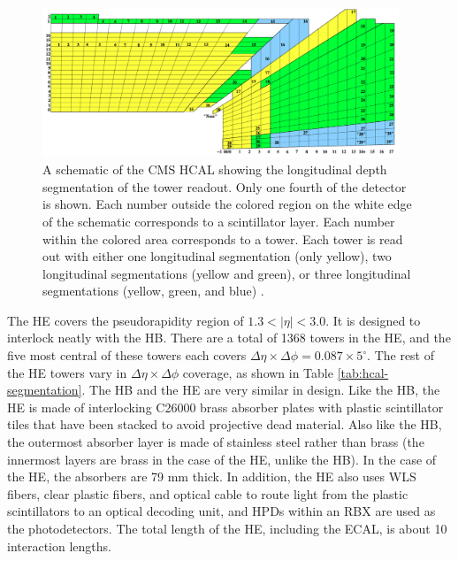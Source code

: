 \begin{figure}
  \centering
  \includegraphics[width=0.95\textwidth]{tex/cms/fig/hcal-segmentation.png}
  \caption{A schematic of the CMS HCAL showing the longitudinal depth
    segmentation of the tower readout.  Only one fourth of the detector is shown.
    Each number outside the colored region on the white edge of the schematic corresponds to a 
    scintillator layer.  Each number within the colored area corresponds to a tower.  
    Each tower is read out with either one longitudinal segmentation (only yellow),
    two longitudinal segmentations (yellow and green), or three longitudinal 
    segmentations (yellow, green, and blue) \cite{hcal-geometry}.}   
  \label{fig:hcal-segmentation}
\end{figure}

The HE covers the pseudorapidity region of $1.3 < |\eta| < 3.0$.
It is designed to interlock neatly with the HB.
There are a total of 1368 towers in the HE, and the five most 
central of these towers each covers $\Delta\eta\times\Delta\phi = 0.087\times5^{\circ}$.
The rest of the HE towers vary in $\Delta\eta\times\Delta\phi$ coverage, as shown
in Table \ref{tab:hcal-segmentation}.
The HB and the HE are very similar in design.  
Like the HB, the HE is made of 
interlocking C26000 brass absorber plates with
plastic scintillator tiles that have been stacked to avoid
projective dead material.  
Also like the HB, the outermost absorber layer is made of stainless steel
rather than brass (the innermost layers are brass in the case of the HE, unlike the HB).
In the case of the HE, the absorbers are 79 mm thick.
In addition, the HE also uses WLS fibers, clear plastic fibers, and 
optical cable to route light from the plastic scintillators to an optical 
decoding unit, and HPDs within an RBX are used as the photodetectors.
The total length of the HE, including the ECAL, is about 10 interaction lengths.

